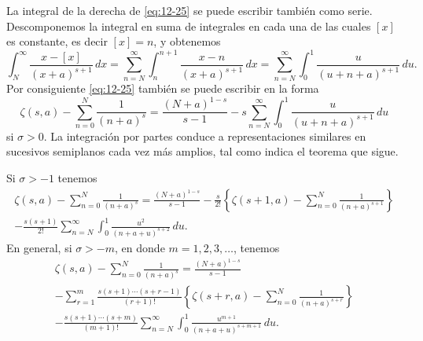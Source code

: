 \documentclass[12pt,a4paper]{book}
\begin{document}
    La integral de la derecha de \eqref{eq:12-25} se puede escribir también como serie.
    Descomponemos la integral en suma de integrales en cada una de las cuales $[x]$ es
    constante, es decir $[x]=n$, y obtenemos
    \begin{equation*}
        \int_{N}^{\infty}\frac{x-[x]}{(x+a)^{s+1}}\,dx=\sum_{n=N}^{\infty}\int_{n}^{n+1}\frac{x-n}{(x+a)^{s+1}}\,dx=\sum_{n=N}^{\infty}\int_{0}^{1}\frac{u}{(u+n+a)^{s+1}}\,du.
    \end{equation*}
    Por consiguiente \eqref{eq:12-25} también se puede escribir en la forma
    \begin{equation}\label{eq:12-26}
        \zeta(s,a)-\sum_{n=0}^{N}\frac{1}{(n+a)^{s}}=\frac{(N+a)^{1-s}}{s-1}-s\sum_{n=N}^{\infty}\int_{0}^{1}\frac{u}{(u+n+a)^{s+1}}\,du
    \end{equation}
    si $\sigma>0$. La integración por partes conduce a representaciones similares en
    sucesivos semiplanos cada vez más amplios, tal como indica el teorema que sigue.

    \begin{teorema}\label{teo:12-22}
        Si $\sigma>-1$ tenemos
        \begin{multline}\label{eq:12-27}
            \zeta(s,a)-\sum_{n=0}^{N}\frac{1}{(n+a)^{s}}=\frac{(N+a)^{1-s}}{s-1}
            -\frac{s}{2!}\left\{\zeta(s+1,a)-\sum_{n=0}^{N}\frac{1}{(n+a)^{s+1}}\right\}\\
            -\frac{s(s+1)}{2!}\sum_{n=N}^{\infty}\int_{0}^{1}\frac{u^{2}}{(n+a+u)^{s+2}}\,du.
        \end{multline}
        En general, si $\sigma>-m$, en donde $m=1,2,3,\dots$, tenemos
        \begin{multline}\label{eq:12-28}
            \zeta(s,a)-\sum_{n=0}^{N}\frac{1}{(n+a)^{s}}=\frac{(N+a)^{1-s}}{s-1}\\
            -\sum_{r=1}^{m}\frac{s(s+1)\cdots(s+r-1)}{(r+1)!}\left\{\zeta(s+r,a)-\sum_{n=0}^{N}\frac{1}{(n+a)^{s+r}}\right\}\\
            -\frac{s(s+1)\cdots(s+m)}{(m+1)!}\sum_{n=N}^{\infty}\int_{0}^{1}\frac{u^{m+1}}{(n+a+u)^{s+m+1}}\,du.
        \end{multline}
    \end{teorema}
\end{document}
